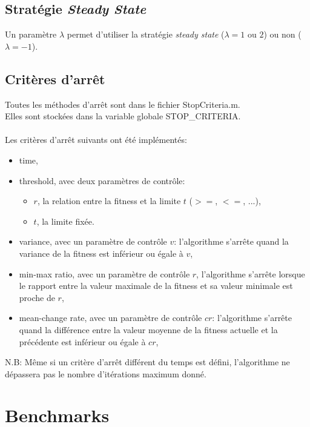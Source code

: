\documentclass[12pt, letterpaper]{article}
\begin{document}
\subsection{Stratégie \textit{Steady State}}

Un paramètre $\lambda$ permet d'utiliser la stratégie \textit{steady state}
($\lambda = 1$ ou $2$) ou non ($\lambda = -1$).

\subsection{Critères d'arrêt}

Toutes les méthodes d'arrêt sont dans le fichier StopCriteria.m.\\
Elles sont stockées dans la variable globale STOP\_CRITERIA.
\\\\
Les critères d'arrêt suivants ont été implémentés:
\begin{itemize}
\item time,
  
\item threshold, avec deux paramètres de contrôle:
  \begin{itemize}
  \item $r$, la relation entre la fitness et la limite $t$ ($>=$, $<=$,
    ...),
    
  \item $t$, la limite fixée.
  \end{itemize}
	
\item variance, avec un paramètre de contrôle $v$: l'algorithme
  s'arrête quand la variance de la fitness est inférieur ou égale à
  $v$,
	
\item min-max ratio, avec un paramètre de contrôle $r$, l'algorithme
  s'arrête lorsque le rapport entre la valeur maximale de la fitness
  et sa valeur minimale est proche de $r$,
	
\item mean-change rate, avec un paramètre de contrôle $cr$:
  l'algorithme s'arrête quand la différence entre la valeur moyenne de
  la fitness actuelle et la précédente est inférieur ou égale à $cr$,
\end{itemize}

N.B: Même si un critère d'arrêt différent du temps est défini,
l'algorithme ne dépassera pas le nombre d'itérations maximum donné.

\section{Benchmarks}
\end{document}
